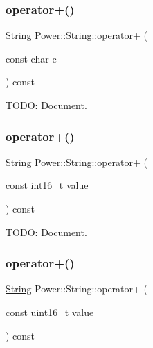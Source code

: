 \subsubsection{\texorpdfstring{operator+()}{operator+()}\hspace{0.1cm}{\footnotesize\ttfamily [3/11]}}
{\footnotesize\ttfamily \hyperlink{class_power_1_1_string}{String} Power\+::\+String\+::operator+ (\begin{DoxyParamCaption}\item[{const char}]{c }\end{DoxyParamCaption}) const\hspace{0.3cm}{\ttfamily [inline]}}



T\+O\+DO\+: Document. 

\mbox{\label{class_power_1_1_string_ad650c3d76fd2ff718f2ee0dd6b9945de}} 
\subsubsection{\texorpdfstring{operator+()}{operator+()}\hspace{0.1cm}{\footnotesize\ttfamily [4/11]}}
{\footnotesize\ttfamily \hyperlink{class_power_1_1_string}{String} Power\+::\+String\+::operator+ (\begin{DoxyParamCaption}\item[{const int16\+\_\+t}]{value }\end{DoxyParamCaption}) const\hspace{0.3cm}{\ttfamily [inline]}}



T\+O\+DO\+: Document. 

\mbox{\label{class_power_1_1_string_a6efb41ecb5b26be77e91fba85a286538}} 
\subsubsection{\texorpdfstring{operator+()}{operator+()}\hspace{0.1cm}{\footnotesize\ttfamily [5/11]}}
{\footnotesize\ttfamily \hyperlink{class_power_1_1_string}{String} Power\+::\+String\+::operator+ (\begin{DoxyParamCaption}\item[{const uint16\+\_\+t}]{value }\end{DoxyParamCaption}) const\hspace{0.3cm}{\ttfamily [inline]}}



